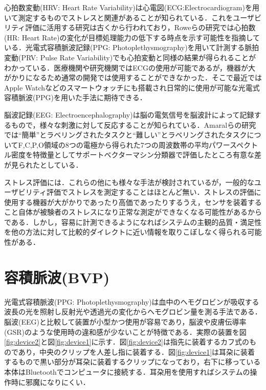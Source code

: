 心拍数変動(HRV: Heart Rate Variability)は心電図(ECG:Electrocardiogram)を用いて測定するものでストレスと関連があることが知られている．これをユーザビリティ評価に活用する研究は古くから行われており，Roweらの研究では心拍数(HR: Heart Rate)の変化が目標処理能力の低下する時点を示す可能性を指摘している\cite{hrv1998}．光電式容積脈波記録(PPG: Photoplethysmography)を用いて計測する脈拍変動(PRV: Pulse Rate Variability)でも心拍変動と同様の結果が得られることがわかっている\cite{ppg}．医療機関や研究機関ではECGの使用が可能であるが，機器が大がかりになるため通常の開発では使用することができなかった．そこで最近ではApple Watchなどのスマートウォッチにも搭載され日常的に使用が可能な光電式容積脈波(PPG)を用いた手法に期待できる．

脳波記録(EEG: Electroencephalography)は脳の電気信号を脳波計によって記録するもので，様々な刺激に対して反応することが知られている．Amaralらの研究では``簡単''とラベリングされたタスクと``難しい''とラベリングされたタスクについてF,C,P,O領域の8つの電極から得られた7つの周波数帯の平均パワースペクトル密度を特徴量としてサポートベクターマシン分類器で評価したところ有意な差が見られたとしている\cite{eeg}．

ストレス評価には．これらの他にも様々な手法が検討されているが，一般的なユーザビリティ評価でストレスを測定することはほとんど無い．ストレスの評価に使用する機器が大がかりであったり高価であったりするうえ，センサを装着すること自体が被験者のストレスになり正常な測定ができなくなる可能性があるからである\cite{tullis2014}．しかし，容易に計測できるようになればシステムの主観的品質・満足性を他の方法に対して比較的ダイレクトに近い情報を取りこぼしなく得られる可能性がある．

\section{容積脈波(BVP)}

光電式容積脈波(PPG: Photoplethysmography)は血中のヘモグロビンが吸収する波長の光を照射し反射光や透過光の変化からヘモグロビン量を測る手法である\cite{pulseoximeter}．脳波(EEG)と比較して装置が小型かつ使用が容易であり，脳波や皮膚伝導率(GSR)のような使用時の違和感が少ないことが特徴である．実際の装置を図\ref{fig:device2}と図\ref{fig:device1}に示す．図\ref{fig:device2}は指先に装着するカフ式のものであり，中央のクリップを人差し指に装着する．図\ref{fig:device1}は耳朶に装着するもので黒い部分が耳朶に装着するクリップになっており，右下に移っている本体はBluetoothでコンピュータに接続する．耳朶用を使用すればシステムの操作時に邪魔になりにくい．

